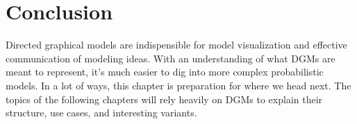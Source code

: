 \section{Conclusion}
Directed graphical models are indispensible for model visualization and effective communication of modeling ideas. With an understanding of what DGMs are meant to represent, it's much easier to dig into more complex probabilistic models. In a lot of ways, this chapter is preparation for where we head next. The topics of the following chapters will rely heavily on DGMs to explain their structure, use cases, and interesting variants.